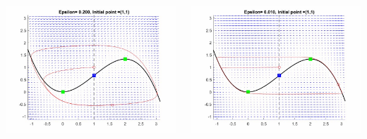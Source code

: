 \documentclass[15pt, a0paper, portrait]{tikzposter}
\begin{document}
\begin{columns}
{
	
	\begin{tikzfigure}[h!]
		\centering
		\includegraphics[height=10cm,width=13cm]{Posterpic1.jpg}
	\end{tikzfigure}
}
{
	\begin{tikzfigure}[h!]
		\centering
		\includegraphics[height=10cm,width=13cm]{Posterpic2.jpg}
\end{tikzfigure}}
\end{columns}
\end{document}
